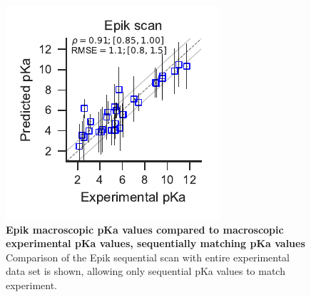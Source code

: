 \documentclass[9pt,lineno,final]{elife}
\begin{document}
\begin{figure}[H]
	\centering
	\includegraphics[scale=1.0]{aligned_pka_epik_scan.pdf}	
	\caption{{\bf Epik macroscopic pKa values compared to macroscopic experimental pKa values, sequentially matching pKa values}
		Comparison of the Epik sequential scan with entire experimental data set is shown, allowing only sequential pKa values to match experiment.\label{fig:correlation-sequential}}
\end{figure}
    
\end{document}
